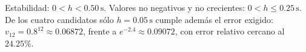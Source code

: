 Estabilidad: \(0<h<0.50\,\mathrm s\). Valores no negativos y no crecientes: \(0<h\le0.25\,\mathrm s\). De los cuatro candidatos sólo \(h=0.05\,\mathrm s\) cumple además el error exigido: \(v_{12}=0.8^{12}\approx0.06872\), frente a \(e^{-2.4}\approx0.09072\), con error relativo cercano al \(24.25\%\).
